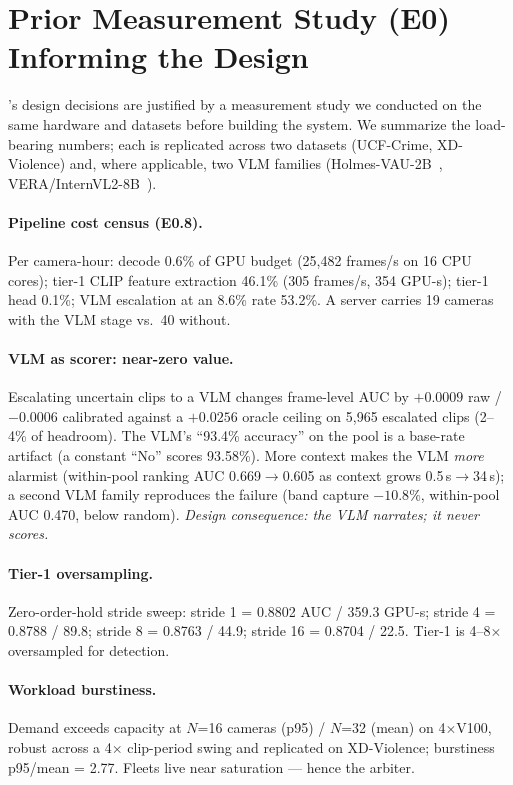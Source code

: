 \section{Prior Measurement Study (E0) Informing the Design}
\label{app:e0}

\sys's design decisions are justified by a measurement study we conducted on the same hardware and datasets before building the system. We summarize the load-bearing numbers; each is replicated across two datasets (UCF-Crime, XD-Violence) and, where applicable, two VLM families (Holmes-VAU-2B~\cite{holmesvau}, VERA/InternVL2-8B~\cite{vera,internvl}).

\paragraph{Pipeline cost census (E0.8).} Per camera-hour: decode 0.6\% of GPU budget (25{,}482 frames/s on 16 CPU cores); tier-1 CLIP feature extraction 46.1\% (305 frames/s, 354 GPU-s); tier-1 head 0.1\%; VLM escalation at an 8.6\% rate 53.2\%. A server carries 19 cameras with the VLM stage vs.\ 40 without.

\paragraph{VLM as scorer: near-zero value.} Escalating uncertain clips to a VLM changes frame-level AUC by $+0.0009$ raw / $-0.0006$ calibrated against a $+0.0256$ oracle ceiling on 5{,}965 escalated clips (2--4\% of headroom). The VLM's ``93.4\% accuracy'' on the pool is a base-rate artifact (a constant ``No'' scores 93.58\%). More context makes the VLM \emph{more} alarmist (within-pool ranking AUC 0.669$\to$0.605 as context grows 0.5\,s$\to$34\,s); a second VLM family reproduces the failure (band capture $-10.8\%$, within-pool AUC 0.470, below random). \emph{Design consequence: the VLM narrates; it never scores.}

\paragraph{Tier-1 oversampling.} Zero-order-hold stride sweep: stride 1 = 0.8802 AUC / 359.3 GPU-s; stride 4 = 0.8788 / 89.8; stride 8 = 0.8763 / 44.9; stride 16 = 0.8704 / 22.5. Tier-1 is 4--8$\times$ oversampled for detection.

\paragraph{Workload burstiness.} Demand exceeds capacity at $N$=16 cameras (p95) / $N$=32 (mean) on 4$\times$V100, robust across a 4$\times$ clip-period swing and replicated on XD-Violence; burstiness p95/mean = 2.77. Fleets live near saturation --- hence the arbiter.

